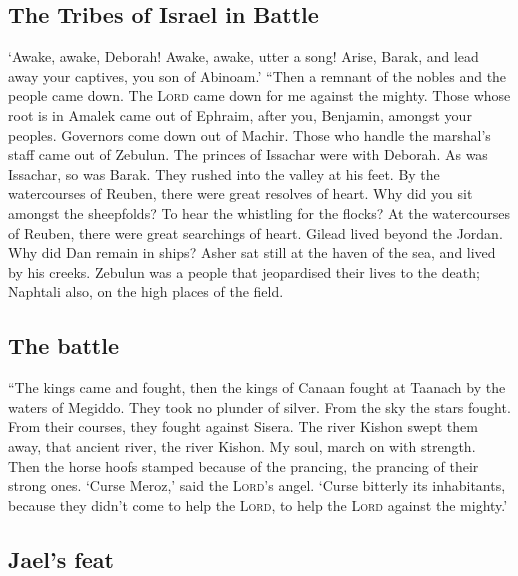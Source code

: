 \hypertarget{the-tribes-of-israel-in-battle}{%
\subsection{The Tribes of Israel in
Battle}\label{the-tribes-of-israel-in-battle}}

 `Awake, awake, Deborah! Awake, awake, utter a song!
Arise, Barak, and lead away your captives, you son of Abinoam.'
 ``Then a remnant of the nobles and the people came down.
The \textsc{Lord} came down for me against the mighty. 
Those whose root is in Amalek came out of Ephraim, after you, Benjamin,
amongst your peoples. Governors come down out of Machir. Those who
handle the marshal's staff came out of Zebulun.  The
princes of Issachar were with Deborah. As was Issachar, so was Barak.
They rushed into the valley at his feet. By the watercourses of Reuben,
there were great resolves of heart.  Why did you sit
amongst the sheepfolds? To hear the whistling for the flocks? At the
watercourses of Reuben, there were great searchings of heart.
 Gilead lived beyond the Jordan. Why did Dan remain in
ships? Asher sat still at the haven of the sea, and lived by his creeks.
 Zebulun was a people that jeopardised their lives to the
death; Naphtali also, on the high places of the field.

\hypertarget{the-battle}{%
\subsection{The battle}\label{the-battle}}

 ``The kings came and fought, then the kings of Canaan
fought at Taanach by the waters of Megiddo. They took no plunder of
silver.  From the sky the stars fought. From their
courses, they fought against Sisera.  The river Kishon
swept them away, that ancient river, the river Kishon. My soul, march on
with strength.  Then the horse hoofs stamped because of
the prancing, the prancing of their strong ones.  `Curse
Meroz,' said the \textsc{Lord}'s angel. `Curse bitterly its inhabitants,
because they didn't come to help the \textsc{Lord}, to help the
\textsc{Lord} against the mighty.'

\hypertarget{jaels-feat}{%
\subsection{Jael's feat}\label{jaels-feat}}

